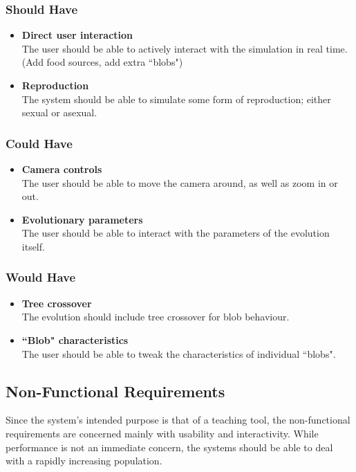 \subsubsection{Should Have}
\begin{itemize}
	\item \textbf{Direct user interaction} \\The user should be able to actively interact with the simulation in real time. (Add food sources, add extra ``blobs")
	\item \textbf{Reproduction} \\The system should be able to simulate some form of reproduction; either sexual or asexual.
\end{itemize}

\subsubsection{Could Have}
\begin{itemize}
	\item \textbf{Camera controls} \\The user should be able to move the camera around, as well as zoom in or out.
	\item \textbf{Evolutionary parameters} \\The user should be able to interact with the parameters of the evolution itself.
\end{itemize}

\subsubsection{Would Have}
\begin{itemize}
	\item \textbf{Tree crossover} \\The evolution should include tree crossover for blob behaviour.
	\item \textbf{``Blob" characteristics} \\The user should be able to tweak the characteristics of individual ``blobs".
\end{itemize}

\subsection{Non-Functional Requirements}
Since the system's intended purpose is that of a teaching tool, the non-functional requirements are concerned mainly with usability and interactivity. While performance is not an immediate concern, the systems should be able to deal with a rapidly increasing population.

